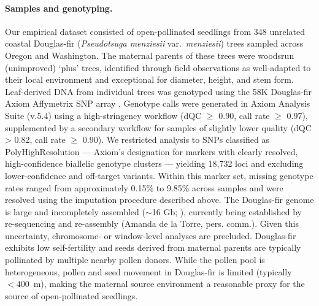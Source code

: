 \documentclass[]{article}
\newcommand{\dfir}{Douglas-fir\xspace}
\begin{document}
\paragraph{Samples and genotyping.}
Our empirical dataset consisted of open-pollinated seedlings from
348 unrelated coastal \dfir
(\textit{Pseudotsuga menziesii} var.\ \textit{menziesii}) trees
sampled across Oregon and Washington.
The maternal parents of these trees were woodsrun (unimproved) `plus' trees,
identified through field observations as well-adapted to their local environment and exceptional
for diameter, height, and stem form. Leaf-derived DNA from individual trees was genotyped using the 58K \dfir
Axiom Affymetrix SNP array \citep{howe_axiom_2020}.
Genotype calls were generated in Axiom Analysis Suite (v.5.4)
using a high-stringency workflow (dQC $\geq$ 0.90, call rate $\geq$ 0.97),
supplemented by a secondary workflow for samples of slightly lower quality
(dQC > 0.82, call rate $\geq$ 0.90).
We restricted analysis to SNPs classified as PolyHighResolution ---
Axiom's designation for markers with clearly resolved,
high-confidence biallelic genotype clusters --- yielding 18,732
loci and excluding lower-confidence and off-target variants.
Within this marker set, missing genotype rates ranged from approximately 
0.15\% to 9.85\% across samples and were resolved using the 
imputation procedure described above.
The \dfir genome is large and incompletely
assembled ($\sim$16 Gb; \citealp{neale_douglas-fir_2017}),
currently being established by re-sequencing and re-assembly (Amanda de la Torre, pers. comm.). 
Given this uncertainty, chromosome- or window-level analyses are precluded.
\dfir exhibits low self-fertility and
seeds derived from maternal parents are typically pollinated by multiple nearby
pollen donors. While the pollen pool is heterogeneous, pollen and seed movement
in \dfir is limited (typically $<400$~m),
making the maternal source environment a reasonable proxy for the source of open-pollinated
seedlings.
\end{document}
